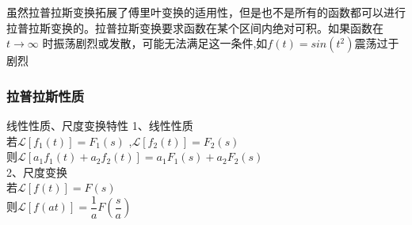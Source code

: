 \documentclass[UTF8,a4paper,12pt]{ctexart}
\begin{document}
  \begin{flushleft}
    虽然拉普拉斯变换拓展了傅里叶变换的适用性，但是也不是所有的函数都可以进行拉普拉斯变换的。拉普拉斯变换要求函数在某个区间内绝对可积。如果函数在$t\rightarrow\infty$ 时振荡剧烈或发散，可能无法满足这一条件,如$f(t)=sin(t^2)$震荡过于剧烈
  \end{flushleft}

  \subsubsection{拉普拉斯性质}
   \begin{titlebox}{线性性质、尺度变换特性}
    1、线性性质
     \\若$\mathcal{L}\left[ f_1\left( t \right) \right] =F_1(s)$ ,$\mathcal{L}\left[ f_2\left( t \right) \right] =F_2(s)$ 
     \\则$\mathcal{L}[a_1 f_1(t) +a_2 f_2(t)] =a_1F_1(s)+a_2F_2(s)$ 
    \\2、尺度变换
    \\若$\mathcal{L}\left[ f\left( t \right) \right] =F(s)$
    \\则$\mathcal{L}[ f( at ) ] =\dfrac{1}{a}F(\dfrac{s}{a})$
   \end{titlebox}
\end{document}
